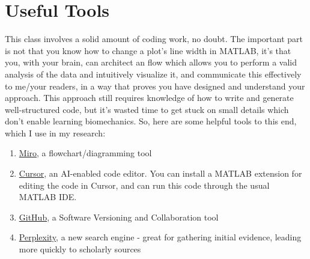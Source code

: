 \documentclass{article}
\begin{document}
\section {Useful Tools}
This class involves a solid amount of coding work, no doubt. The important part is not that you know how to change a plot's line width in MATLAB, it's that you, with your brain, can architect an flow which allows you to perform a valid analysis of the data and intuitively visualize it, and communicate this effectively to me/your readers, in a way that proves you have designed and understand your approach. This approach still requires knowledge of how to write and generate well-structured code, but it's wasted time to get stuck on small details which don't enable learning biomechanics. So, here are some helpful tools to this end, which I use in my research:

\begin{enumerate}
\item \href{https://miro.com/}{Miro}, a flowchart/diagramming tool
\item \href{https://www.cursor.com/}{Cursor}, an AI-enabled code editor. You can install a MATLAB extension for editing the code in Cursor, and can run this code through the usual MATLAB IDE.
\item \href{https://www.github.com}{GitHub}, a Software Versioning and Collaboration tool
\item \href{https://www.perplexity.ai/}{Perplexity}, a new search engine - great for gathering initial evidence, leading more quickly to scholarly sources
\end{enumerate}
\end{document}
